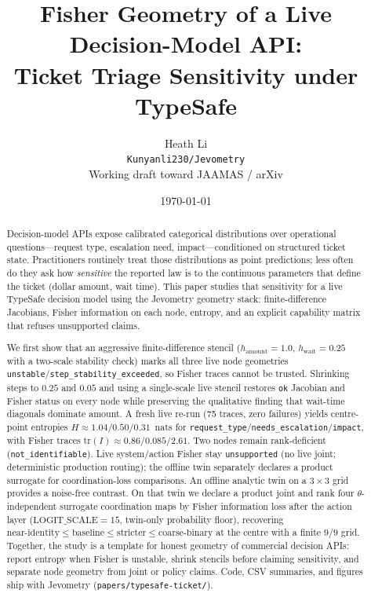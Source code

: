 \documentclass[11pt,a4paper]{article}
\title{Fisher Geometry of a Live Decision-Model API:\\
Ticket Triage Sensitivity under TypeSafe}
\author{
  Heath Li\\
  \texttt{Kunyanli230/Jevometry}\\
  \small Working draft toward JAAMAS / arXiv
}
\date{\today}
\begin{document}
\maketitle

\begin{abstract}
Decision-model APIs expose calibrated categorical distributions over
operational questions---request type, escalation need, impact---conditioned on
structured ticket state. Practitioners routinely treat those distributions as
point predictions; less often do they ask how \emph{sensitive} the reported law
is to the continuous parameters that define the ticket (dollar amount, wait
time). This paper studies that sensitivity for a live TypeSafe decision model
using the Jevometry geometry stack: finite-difference Jacobians, Fisher
information on each node, entropy, and an explicit capability matrix that
refuses unsupported claims.

We first show that an aggressive finite-difference stencil
($h_{\mathrm{amount}}{=}1.0$, $h_{\mathrm{wait}}{=}0.25$ with a two-scale
stability check) marks all three live node geometries
\texttt{unstable}/\texttt{step\_stability\_exceeded}, so Fisher traces cannot
be trusted. Shrinking steps to $0.25$ and $0.05$ and using a single-scale live
stencil restores \texttt{ok} Jacobian and Fisher status on every node while
preserving the qualitative finding that wait-time diagonals dominate amount.
A fresh live re-run (75 traces, zero failures) yields centre-point entropies
$H\!\approx\!1.04/0.50/0.31$~nats for
\texttt{request\_type}/\texttt{needs\_escalation}/\texttt{impact}, with Fisher
traces $\mathrm{tr}(I)\!\approx\!0.86/0.085/2.61$. Two nodes remain
rank-deficient (\texttt{not\_identifiable}). Live system/action Fisher stay
\texttt{unsupported} (no live joint; deterministic production routing); the
offline twin separately declares a product surrogate for coordination-loss
comparisons. An offline analytic twin on a $3{\times}3$ grid provides a
noise-free contrast. On that twin we declare a product joint and rank four
$\theta$-independent surrogate coordination maps by Fisher information loss
after the action layer ($\mathrm{LOGIT\_SCALE}{=}15$, twin-only probability
floor), recovering
$\mathrm{near\text{-}identity}\le\mathrm{baseline}\le\mathrm{stricter}
\le\mathrm{coarse\text{-}binary}$
at the centre with a finite $9/9$ grid. Together, the study is a template for honest geometry of
commercial decision APIs: report entropy when Fisher is unstable, shrink
stencils before claiming sensitivity, and separate node geometry from joint or
policy claims. Code, CSV summaries, and figures ship with Jevometry
(\texttt{papers/typesafe-ticket/}).
\end{abstract}
\end{document}
